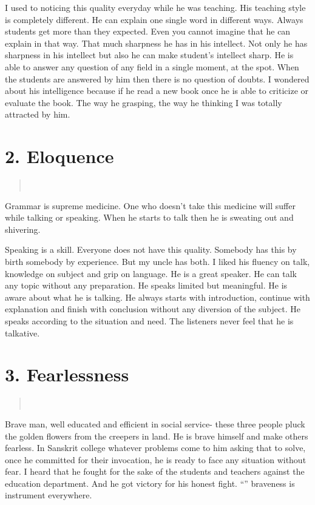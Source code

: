 I used to noticing this quality everyday while he was teaching. His teaching style is completely different. He can explain one single word in different ways. Always students get more than they expected. Even you cannot imagine that he can explain in that way. That much sharpness he has in his intellect. Not only he has sharpness in his intellect but also he can make student’s intellect sharp.  He is able to answer any question of any field in a single moment, at the spot. When the students are answered by him then there is no question of doubts. I wondered about his intelligence because if he read a new book once he is able to criticize or evaluate the book. The way he grasping, the way he thinking I was totally attracted by him.

\section*{2. Eloquence }
\begin{verse}
\\
\end{verse}
Grammar is supreme medicine. One who doesn’t take this medicine will suffer while talking or speaking. When he starts to talk then he is sweating out and shivering.

Speaking is a skill. Everyone does not have this quality. Somebody has this by birth somebody by experience. But my uncle has both. I liked his fluency on talk, knowledge on subject and grip on language. He is a great speaker. He can talk any topic without any preparation. He speaks limited but meaningful. He is aware about what he is talking. He always starts with introduction, continue with explanation and finish with conclusion without any diversion of the subject. He speaks according to the situation and need. The listeners never feel that he is talkative.

\section*{3. Fearlessness }
\begin{verse}
\\
\end{verse}
Brave man, well educated and efficient in social service- these three people pluck the golden flowers from the creepers in land.
He is brave himself and make others fearless. In Sanskrit college whatever problems come to him asking that to solve, once he committed for their invocation, he is ready to face any situation without fear. I heard that he fought for the sake of the students and teachers against the education department. And he got victory for his honest fight. “” braveness is instrument everywhere.

